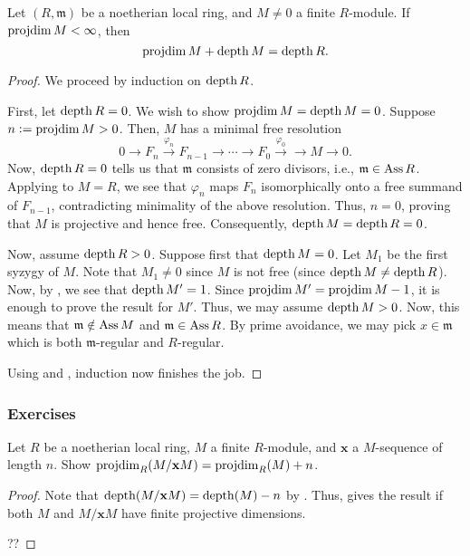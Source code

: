 \documentclass[12pt]{article}
\begin{document}
\begin{thm} \label{thm:auslander-buchsbaum}
	Let $(R, \mathfrak{m})$ be a noetherian local ring, and $M \neq 0$ a finite $R$-module. If $\operatorname{projdim} M < \infty$, then
	\begin{equation*} 
		\operatorname{projdim} M + \operatorname{depth} M = \operatorname{depth} R.
	\end{equation*}
\end{thm}
\begin{proof} 
	We proceed by induction on $\operatorname{depth} R$.

	First, let $\operatorname{depth} R = 0$. We wish to show $\operatorname{projdim} M = \operatorname{depth} M = 0$. Suppose $n \vcentcolon= \operatorname{projdim} M > 0$. Then, $M$ has a minimal free resolution
	\begin{equation*} 
		0 \to F_{n} \xrightarrow{\varphi_{n}} F_{n - 1} \to \cdots \to F_{0} \xrightarrow{\varphi_{0}} \to M \to 0.
	\end{equation*}
	Now, $\operatorname{depth} R = 0$ tells us that $\mathfrak{m}$ consists of zero divisors, i.e., $\mathfrak{m} \in \operatorname{Ass} R$. Applying  to $M = R$, we see that $\varphi_{n}$ maps $F_{n}$ isomorphically onto a free summand of $F_{n - 1}$, contradicting minimality of the above resolution. \newline
	Thus, $n = 0$, proving that $M$ is projective and hence free. Consequently, $\operatorname{depth} M = \operatorname{depth} R = 0$.

	Now, assume $\operatorname{depth} R > 0$. Suppose first that $\operatorname{depth} M = 0$. Let $M_{1}$ be the first syzygy of $M$. Note that $M_{1} \neq 0$ since $M$ is not free (since $\operatorname{depth} M \neq \operatorname{depth} R$). Now, by , we see that $\operatorname{depth} M' = 1$. Since $\operatorname{projdim} M' = \operatorname{projdim} M - 1$, it is enough to prove the result for $M'$. Thus, we may assume $\operatorname{depth} M > 0$. \newline
	Now, this means that $\mathfrak{m} \notin \operatorname{Ass} M$ and $\mathfrak{m} \in \operatorname{Ass} R$. By prime avoidance, we may pick $x \in \mathfrak{m}$ which is both $\mathfrak{m}$-regular and $R$-regular.

	Using  and , induction now finishes the job.
\end{proof}

\subsubsection{Exercises}

\begin{ex}
	Let $R$ be a noetherian local ring, $M$ a finite $R$-module, and $\mathbf{x}$ a $M$-sequence of length $n$. Show $\operatorname{projdim}_{R}(M/\mathbf{x} M) = \operatorname{projdim}_{R}(M) + n$.
\end{ex}
\begin{proof} 
	Note that $\operatorname{depth}(M/\mathbf{x} M) = \operatorname{depth}(M) - n$ by . Thus,  gives the result if both $M$ and $M/\mathbf{x} M$ have finite projective dimensions.

	??
\end{proof}
\end{document}

